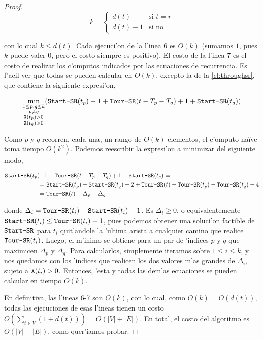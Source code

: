 \begin{theorem}
\begin{proof}
\[k = \left\{
	\begin{array}{ll}
		d(t) & \mbox{si } t = r\\
		d(t) - 1 & \mbox{si no}
	\end{array}
\right.\]

\noindent
con lo cual $k \leq d(t)$. Cada ejecuci'on de la l'inea 6 es $O(k)$ (sumamos $1$, pues $k$ puede valer $0$, pero el costo siempre es positivo). El costo de la l'inea 7 es el costo de realizar los c'omputos indicados por las ecuaciones de recurrencia. Es f'acil ver que todas se pueden calcular en $O(k)$, excepto la de la \autoref{cl:throughsr}, que contiene la siguiente expresi'on,

\[\min\limits_{\substack{1 \leq p, q \leq k \\ p \neq q \\ \texttt{X}(t_p) > 0 \\ \texttt{X}(t_q) > 0}} (\texttt{Start-SR}(t_p) + 1 + \texttt{Tour-SR}(t - T_p - T_q) + 1 + \texttt{Start-SR}(t_q))\]

\noindent
Como $p$ y $q$ recorren, cada una, un rango de $O(k)$ elementos, el c'omputo na\"ive toma tiempo $O(k^2)$. Podemos reescribir la expresi'on a minimizar del siguiente modo,

\begin{align*}
\texttt{Start-SR}(t_p) + &1 + \texttt{Tour-SR}(t - T_p - T_q) + 1 + \texttt{Start-SR}(t_q) =\\
=& \text{ }\texttt{Start-SR}(t_p) + \texttt{Start-SR}(t_q) + 2 + \texttt{Tour-SR}(t) - \texttt{Tour-SR}(t_p) - \texttt{Tour-SR}(t_q) - 4\\
=& \text{ }\texttt{Tour-SR}(t) - \Delta_p - \Delta_q
\end{align*}

\noindent
donde $\Delta_i = \texttt{Tour-SR}(t_i) - \texttt{Start-SR}(t_i) - 1$. Es $\Delta_i \geq 0$, o equivalentemente $\texttt{Start-SR}(t_i) \leq \texttt{Tour-SR}(t_i) - 1$, pues podemos obtener una soluci'on factible de $\texttt{Start-SR}$ para $t_i$ quit'andole la 'ultima arista a cualquier camino que realice $\texttt{Tour-SR}(t_i)$. Luego, el m'inimo se obtiene para un par de 'indices $p$ y $q$ que maximicen $\Delta_p$ y $\Delta_q$. Para calcularlos, simplemente iteramos sobre $1 \leq i \leq k$, y nos quedamos con los 'indices que realicen los dos valores m'as grandes de $\Delta_i$, sujeto a $\texttt{X}(t_i) > 0$. Entonces, 'esta y todas las dem'as ecuaciones se pueden calcular en tiempo $O(k)$.

En definitiva, las l'ineas 6-7 son $O(k)$, con lo cual, como $O(k) = O(d(t))$, todas las ejecuciones de esas l'ineas tienen un costo $O(\sum_{t \in V} (1 + d(t))) = O(|V| + |E|)$. En total, el costo del algoritmo es $O(|V| + |E|)$, como quer'iamos probar.
\end{proof}
\end{theorem}


